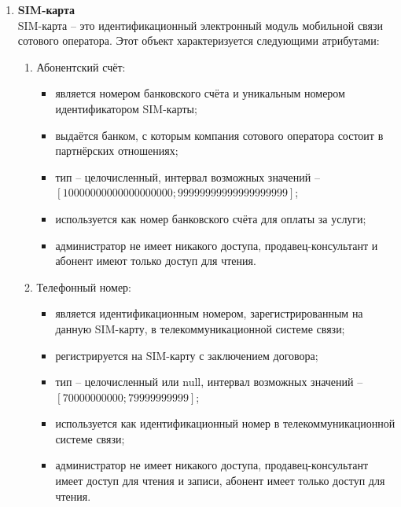 \begin{enumerate}
    \item \textbf{SIM-карта} \\
    SIM-карта -- это идентификационный электронный модуль мобильной связи сотового оператора. Этот объект характеризуется следующими атрибутами:
    \begin{enumerate}
        \item Абонентский счёт:
        \begin{itemize}
            \item является номером банковского счёта и уникальным номером идентификатором SIM-карты;
            \item выдаётся банком, с которым компания сотового оператора состоит в партнёрских отношениях;
            \item тип -- целочисленный, интервал возможных значений -- $[10000000000000000000; 99999999999999999999]$;
            \item используется как номер банковского счёта для оплаты за услуги;
            \item администратор не имеет никакого доступа, продавец-консультант и абонент имеют только доступ для чтения.
        \end{itemize}

        \item Телефонный номер:
        \begin{itemize}
            \item является идентификационным номером, зарегистрированным на данную SIM-карту, в телекоммуникационной системе связи;
            \item регистрируется на SIM-карту с заключением договора;
            \item тип -- целочисленный или null, интервал возможных значений -- $[70000000000; 79999999999]$;
            \item используется как идентификационный номер в телекоммуникационной системе связи;
            \item администратор не имеет никакого доступа, продавец-консультант имеет доступ для чтения и записи, абонент имеет только доступ для чтения.
        \end{itemize}


\end{enumerate}
\end{enumerate}
